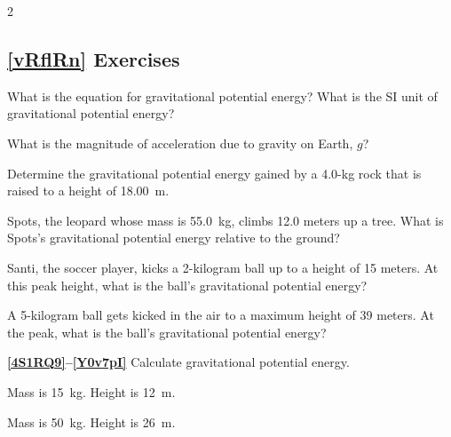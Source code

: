 \documentclass{article}
\numberwithin{equation}{section}
\numberwithin{figure}{section}
\begin{document}
\begin{multicols}{2}
\subsection*{\ref{vRflRn} Exercises}

\begin{exercise} \label{xxSTEr}
    What is the equation for gravitational potential energy? What is the SI unit of gravitational potential energy?
\end{exercise}

\begin{exercise}
    What is the magnitude of acceleration due to gravity on Earth, $g$?
\end{exercise}

\begin{exercise} \label{9p9meZ}
Determine the gravitational potential energy gained by a 4.0-kg rock that is raised to a height of \SI{18.00}{m}.
\end{exercise}

\begin{exercise} \label{i6NTnH}
Spots, the leopard whose mass is \SI{55.0}{kg}, climbs 12.0 meters up a tree. What is Spots's gravitational potential energy relative to the ground?
\end{exercise}

\begin{exercise} \label{FAhPt5}
    Santi, the soccer player, kicks a 2-kilogram ball up to a height of 15 meters. At this peak height, what is the ball's gravitational potential energy?
\end{exercise}

\begin{exercise} \label{Nn51QC}
    A 5-kilogram ball gets kicked in the air to a maximum height of 39 meters. At the peak, what is the ball's gravitational potential energy?
\end{exercise}
\vspace{-1ex}

\cyanhrule

\textbf{\ref{4S1RQ9}--\ref{Y0v7pI}} Calculate gravitational potential energy.

\begin{exercise} \label{4S1RQ9}
    Mass is \SI{15}{kg}. Height is \SI{12}{m}.
\end{exercise}

\begin{exercise} \label{NS8TFJ}
    Mass is \SI{50}{kg}. Height is \SI{26}{m}.
\end{exercise}


\end{multicols}
\end{document}
